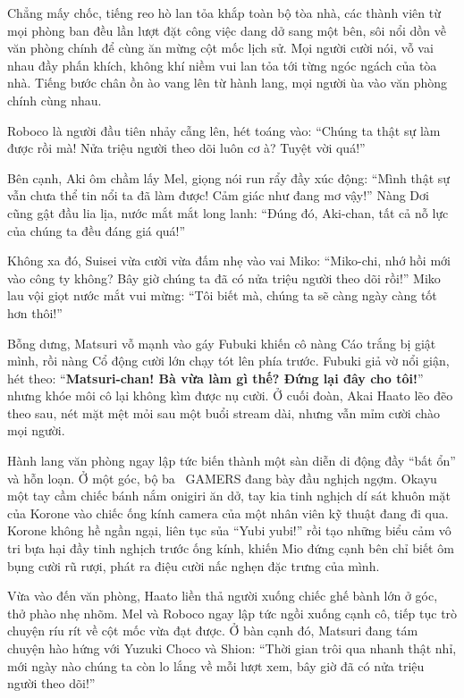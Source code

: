 \documentclass[../main.tex]{subfiles}
\begin{document}
Chẳng mấy chốc, tiếng reo hò lan tỏa khắp toàn bộ tòa nhà, các thành viên từ mọi phòng ban đều lần lượt đặt công việc dang dở sang một bên, sôi nổi dồn về văn phòng chính để cùng ăn mừng cột mốc lịch sử. Mọi người cười nói, vỗ vai nhau đầy phấn khích, không khí niềm vui lan tỏa tới từng ngóc ngách của tòa nhà. Tiếng bước chân ồn ào vang lên từ hành lang, mọi người ùa vào văn phòng chính cùng nhau.


Roboco là người đầu tiên nhảy cẫng lên, hét toáng vào: ``Chúng ta thật sự làm được rồi mà! Nửa triệu người theo dõi luôn cơ à? Tuyệt vời quá!''

Bên cạnh, Aki ôm chầm lấy Mel, giọng nói run rẩy đầy xúc động: ``Mình thật sự vẫn chưa thể tin nổi ta đã làm được! Cảm giác như đang mơ vậy!'' Nàng Dơi cũng gật đầu lia lịa, nước mắt mắt long lanh: ``Đúng đó, Aki-chan, tất cả nỗ lực của chúng ta đều đáng giá quá!''

Không xa đó, Suisei vừa cười vừa đấm nhẹ vào vai Miko: ``Miko-chi, nhớ hồi mới vào công ty không? Bây giờ chúng ta đã có nửa triệu người theo dõi rồi!'' Miko lau vội giọt nước mắt vui mừng: ``Tôi biết mà, chúng ta sẽ càng ngày càng tốt hơn thôi!''

Bỗng dưng, Matsuri vỗ mạnh vào gáy Fubuki khiến cô nàng Cáo trắng bị giật mình, rồi nàng Cổ động cười lớn chạy tót lên phía trước. Fubuki giả vờ nổi giận, hét theo: ``\textbf{Matsuri-chan! Bà vừa làm gì thế? Đứng lại đây cho tôi!}'' nhưng khóe môi cô lại không kìm được nụ cười. Ở cuối đoàn, Akai Haato lẽo đẽo theo sau, nét mặt mệt mỏi sau một buổi stream dài, nhưng vẫn mỉm cười chào mọi người.

Hành lang văn phòng ngay lập tức biến thành một sàn diễn di động đầy ``bất ổn'' và hỗn loạn. Ở một góc, bộ ba \hll\ GAMERS đang bày đầu nghịch ngợm. Okayu một tay cầm chiếc bánh nắm onigiri ăn dở, tay kia tinh nghịch dí sát khuôn mặt của Korone vào chiếc ống kính camera của một nhân viên kỹ thuật đang đi qua. Korone không hề ngần ngại, liên tục sủa ``Yubi yubi!'' rồi tạo những biểu cảm vô tri bựa hại đầy tinh nghịch trước ống kính, khiến Mio đứng cạnh bên chỉ biết ôm bụng cười rũ rượi, phát ra điệu cười nấc nghẹn đặc trưng của mình.


Vừa vào đến văn phòng, Haato liền thả người xuống chiếc ghế bành lớn ở góc, thở phào nhẹ nhõm. Mel và Roboco ngay lập tức ngồi xuống cạnh cô, tiếp tục trò chuyện ríu rít về cột mốc vừa đạt được. Ở bàn cạnh đó, Matsuri đang tám chuyện hào hứng với Yuzuki Choco và Shion: ``Thời gian trôi qua nhanh thật nhỉ, mới ngày nào chúng ta còn lo lắng về mỗi lượt xem, bây giờ đã có nửa triệu người theo dõi!''
\end{document}
